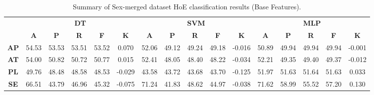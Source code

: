 \begin{landscape}
\begin{table}[htbp]
\footnotesize
\centering
\caption{Summary of Sex-merged dataset HoE classification results (Base Features).}
\label{tab:base_hoe_sex}
\begin{tabular}{|c|c|c|c|c|c|c|c|c|c|c|c|c|c|c|c|}
\hline
\multirow{2}{*}{}	& \multicolumn{5}{c|}{\textbf{DT}}												& \multicolumn{5}{c|}{\textbf{SVM}}												& \multicolumn{5}{c|}{\textbf{MLP}}												\\ \cline{2-16} 
					& \textbf{A}	& \textbf{P}	& \textbf{R}	& \textbf{F}	& \textbf{K}	& \textbf{A}	& \textbf{P}	& \textbf{R}	& \textbf{F}	& \textbf{K}	& \textbf{A}	& \textbf{P}	& \textbf{R}	& \textbf{F}	& \textbf{K}	\\ \hline
\textbf{AP}			& 54.53			& 53.53			& 53.51			& 53.52			& 0.070			& 52.06			& 49.12			& 49.24			& 49.18			& -0.016			& 50.89			& 49.94			& 49.94			& 49.94		& -0.001		\\ \hline
\textbf{AT}			& 54.00			& 50.82			& 50.72			& 50.77			& 0.015			& 52.41			& 48.05			& 48.40			& 48.22			& -0.034			& 52.21			& 49.35			& 49.40			& 49.37		& -0.012		\\ \hline
\textbf{PL}			& 49.76			& 48.48			& 48.58			& 48.53			& -0.029		& 43.58			& 43.72			& 43.68			& 43.70			& -0.125			& 51.97			& 51.63			& 51.64			& 51.63		& 0.033			\\ \hline
\textbf{SE}			& 66.51			& 43.79			& 46.96			& 45.32			& -0.075		& 71.24			& 41.83			& 48.62			& 44.97			& -0.038			& 71.62			& 58.99			& 55.52			& 57.20		& 0.130			\\ \hline
\end{tabular}
\end{table}
\end{landscape}